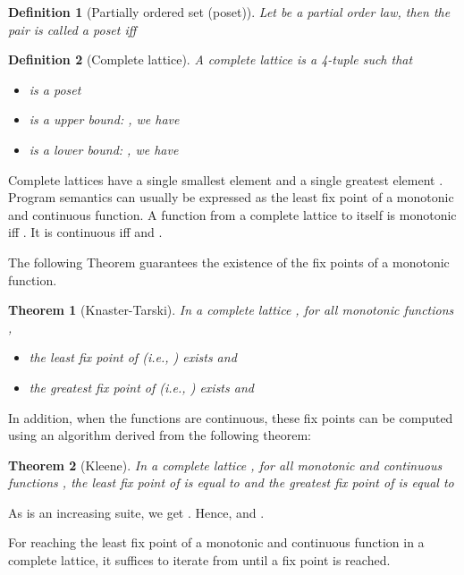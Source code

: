 \documentclass[submission,copyright,creativecommons]{eptcs}
\newtheorem{definition}{Definition}
\newtheorem{theorem}{Theorem}
\begin{document}
\begin{definition}[Partially ordered set (poset)]
  Let  be a partial order law, then
  the pair  is called a {\it poset} iff

\end{definition}

\begin{definition}[Complete lattice]
  A complete lattice is a 4-tuple  such that
\begin{itemize}
\item  is a poset 
\item  is a upper bound: , we have
  
\item    is a lower bound: , we have
  
\end{itemize}
\end{definition}
\noindent 
Complete lattices have a single smallest element  
and a single greatest element . 
Program semantics can usually be expressed as the least fix point of a monotonic and continuous function.
A function  from a complete lattice  to itself is monotonic iff 
.
It is continuous iff
 and 
. 

\noindent
The following Theorem guarantees the existence
of the fix points of a monotonic function.
\begin{theorem}[Knaster-Tarski]
  In a complete lattice , for all monotonic functions\\ 
, 
\begin{itemize}
\item the least fix point of  (i.e., ) exists and 
\item the greatest fix point of  (i.e., ) exists and 
\end{itemize}
\end{theorem}
\noindent
In addition, when the functions are continuous, these fix points can be computed using an algorithm derived from the
following theorem:
\begin{theorem}[Kleene]\label{theo:limites}
  In a complete lattice , for all monotonic and continuous functions 
  , the least fix point of
   is equal to  and the greatest fix point
  of  is equal to 
\end{theorem}
\noindent
As  is an increasing suite, we get
.
Hence, 
and .

\noindent
For reaching the least fix point of a monotonic and continuous function in a complete lattice, it
suffices to iterate  from  until a fix point is reached.
\end{document}
